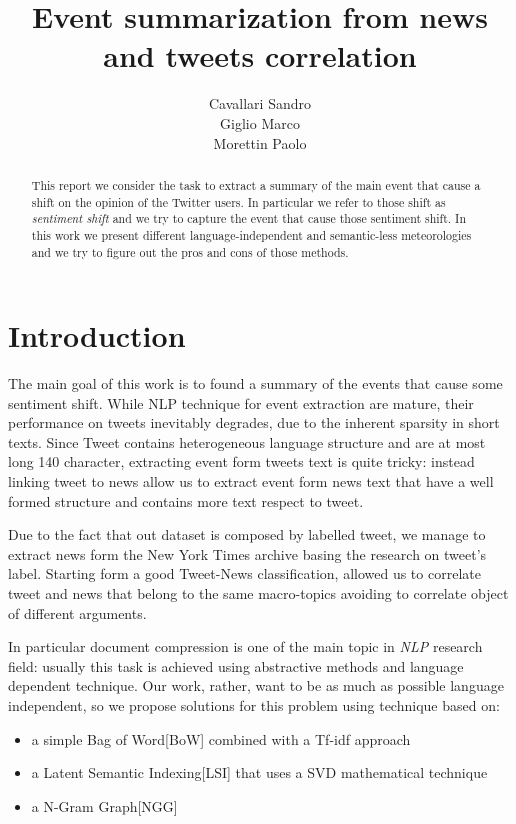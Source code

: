 \documentclass{acm_proc_article-sp-sigmod07}
\begin{document}
\title{Event summarization from news and tweets correlation}
\author{Cavallari Sandro\\Giglio Marco\\Morettin Paolo}

%
\maketitle
\begin{abstract}

This report we consider the task to extract a summary of the main event that cause a shift on the opinion of the Twitter users. In particular we refer to those shift as \emph{sentiment shift} and we try to capture the event that cause those sentiment shift. In this work we present different language-independent and semantic-less meteorologies and we try to figure out the pros and cons of those methods. 
\end{abstract}

\section*{Introduction}

The main goal of this work is to found a summary of the events that cause some sentiment shift. While NLP technique for event extraction are mature, their performance on tweets inevitably degrades, due to the inherent sparsity in short texts.  Since Tweet contains heterogeneous language structure and are at most long 140 character, extracting event form tweets text is quite tricky: instead linking tweet to news allow us to extract event form news text that have a well formed structure and contains more text respect to tweet.

Due to the fact that out dataset is composed by labelled tweet, we manage to extract news form the New York Times archive basing the research on tweet's label. Starting form a good Tweet-News classification, allowed us to correlate tweet and news that belong to the same macro-topics avoiding to correlate object of different arguments.

In particular document compression is one of the main topic in \emph{NLP} research field: usually this task is achieved using abstractive methods and language dependent technique.  Our work, rather, want to be as much as possible language independent, so we propose solutions for this problem using technique based on:
\begin{itemize}
	\item a simple Bag of Word[BoW] combined with a Tf-idf approach
	\item a Latent Semantic Indexing[LSI] that uses a SVD mathematical technique \cite{LSA}
	\item a N-Gram Graph[NGG] \cite{Ngram}
\end{itemize}
\end{document}
